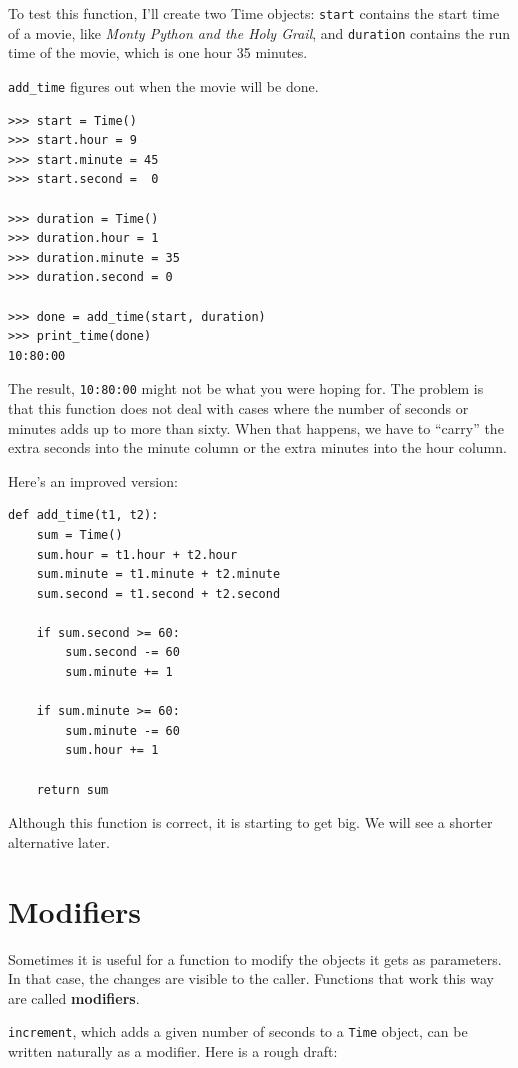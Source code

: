 \documentclass[10pt]{book}
\begin{document}
\begin{CJK}{UTF8}{gbsn}
To test this function, I'll create two Time objects: {\tt start}
contains the start time of a movie, like {\em Monty Python and the
Holy Grail}, and {\tt duration} contains the run time of the movie,
which is one hour 35 minutes.

\verb"add_time" figures out when the movie will be done.

\begin{verbatim}
>>> start = Time()
>>> start.hour = 9
>>> start.minute = 45
>>> start.second =  0

>>> duration = Time()
>>> duration.hour = 1
>>> duration.minute = 35
>>> duration.second = 0

>>> done = add_time(start, duration)
>>> print_time(done)
10:80:00
\end{verbatim}
%
The result, {\tt 10:80:00} might not be what you were hoping
for.  The problem is that this function does not deal with cases where the
number of seconds or minutes adds up to more than sixty.  When that
happens, we have to ``carry'' the extra seconds into the minute column
or the extra minutes into the hour column.

Here's an improved version:

\begin{verbatim}
def add_time(t1, t2):
    sum = Time()
    sum.hour = t1.hour + t2.hour
    sum.minute = t1.minute + t2.minute
    sum.second = t1.second + t2.second

    if sum.second >= 60:
        sum.second -= 60
        sum.minute += 1

    if sum.minute >= 60:
        sum.minute -= 60
        sum.hour += 1

    return sum
\end{verbatim}
%
Although this function is correct, it is starting to get big.
We will see a shorter alternative later.


\section{Modifiers}
\label{increment}

Sometimes it is useful for a function to modify the objects it gets as
parameters.  In that case, the changes are visible to the caller.
Functions that work this way are called {\bf modifiers}.

{\tt increment}, which adds a given number of seconds to a {\tt Time}
object, can be written naturally as a
modifier.  Here is a rough draft:


\end{CJK}
\end{document}
